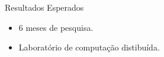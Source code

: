 \begin{frame}{Resultados Esperados}
\begin{itemize}
		\item 6 meses de pesquisa.
		\item Laboratório de computação distibuída.
	\end{itemize} 
\end{frame}
